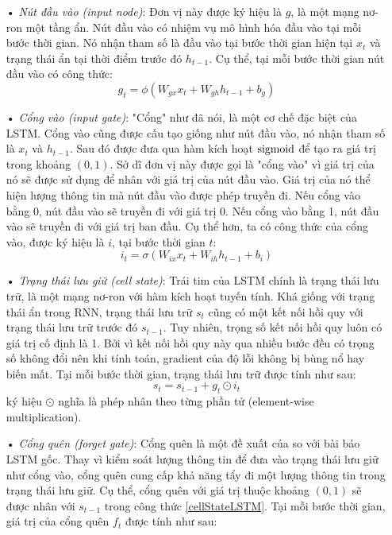 \begin{itemize}
	\item[•] \textit{Nút đầu vào (input node)}: Đơn vị này được ký hiệu là $g$, là một mạng nơ-ron một tầng ẩn. Nút đầu vào có nhiệm vụ mô hình hóa đầu vào tại mỗi bước thời gian. Nó nhận tham số là đầu vào tại bước thời gian hiện tại $x_t$ và trạng thái ẩn tại thời điểm trước đó $h_{t-1}$. Cụ thể, tại mỗi bước thời gian nút đầu vào có công thức:
	\begin{equation} \label{inputNodeLSTM}
		g_t = \phi \left(W_{gx}x_t + W_{gh}h_{t-1} + b_g \right)
	\end{equation}
	\item[•] \textit{Cổng vào (input gate)}: "Cổng" như đã nói, là một cơ chế đặc biệt của LSTM. Cổng vào cũng được cấu tạo giống như nút đầu vào, nó nhận tham số là $x_t$ và $h_{t-1}$. Sau đó được đưa qua hàm kích hoạt $\mathrm{sigmoid}$ để tạo ra giá trị trong khoảng $(0,1)$. Sở dĩ đơn vị này được gọi là "cổng vào" vì giá trị của nó sẽ được sử dụng để nhân với giá trị của nút đầu vào. Giá trị của nó thể hiện lượng thông tin mà nút đầu vào được phép truyền đi. Nếu cổng vào bằng 0, nút đầu vào sẽ truyền đi với giá trị 0. Nếu cổng vào bằng 1, nút đầu vào sẽ truyền đi với giá trị ban đầu. Cụ thể hơn, ta có công thức của cổng vào, được ký hiệu là $i$, tại bước thời gian $t$:
	\begin{equation} \label{inputGateLSTM}
		i_t = \sigma \left(W_{ix}x_t + W_{ih}h_{t-1} + b_i \right)
	\end{equation}
	\item[•] \textit{Trạng thái lưu giữ (cell state)}: Trái tim của LSTM chính là trạng thái lưu trữ, là một mạng nơ-ron với hàm kích hoạt tuyến tính. Khá giống với trạng thái ẩn trong RNN, trạng thái lưu trữ $s_t$ cũng có một kết nối hồi quy với trạng thái lưu trữ trước đó $s_{t-1}$. Tuy nhiên, trọng số kết nối hồi quy luôn có giá trị cố định là 1. Bởi vì kết nối hồi quy này qua nhiều bước đều có trọng số không đổi nên khi tính toán, gradient của độ lỗi không bị bùng nổ hay biến mất. Tại mỗi bước thời gian, trạng thái lưu trữ được tính như sau:
	\begin{equation} \label{cellStateLSTM}
		s_t = s_{t-1} + g_t \odot i_t
	\end{equation}
	ký hiệu $\odot$ nghĩa là phép nhân theo từng phần tử (element-wise multiplication).
	\item[•] \textit{Cổng quên (forget gate)}: Cổng quên là một đề xuất của \cite{gers2000} so với bài báo LSTM gốc. Thay vì kiểm soát lượng thông tin để đưa vào trạng thái lưu giữ như cổng vào, cổng quên cung cấp khả năng tẩy đi một lượng thông tin trong trạng thái lưu giữ. Cụ thể, cổng quên với giá trị thuộc khoảng $(0,1)$ sẽ được nhân với $s_{t-1}$ trong công thức \ref{cellStateLSTM}. Tại mỗi bước thời gian, giá trị của cổng quên $f_t$ được tính như sau:

\end{itemize}
